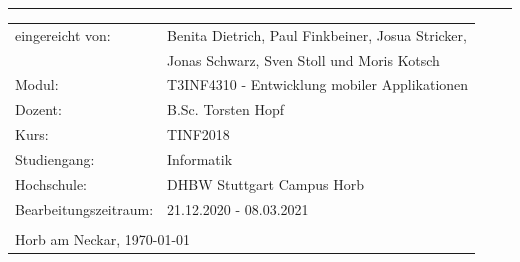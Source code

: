 \begin{flushleft}
    {\Large{}\rule[0.5ex]{1\columnwidth}{1pt}}{\Large\par}
    \par
\end{flushleft}

\begin{tabular}{ll}
    eingereicht von:\hspace{1cm} & Benita Dietrich, Paul Finkbeiner, Josua Stricker,
    \tabularnewline
    & Jonas Schwarz, Sven Stoll und Moris Kotsch
    \tabularnewline
    Modul: & T3INF4310 - Entwicklung mobiler Applikationen
    \tabularnewline
    Dozent: & B.Sc. Torsten Hopf
    \tabularnewline
    Kurs: & TINF2018
    \tabularnewline
    Studiengang: & Informatik
    \tabularnewline
    Hochschule: & DHBW Stuttgart Campus Horb
    \tabularnewline
    Bearbeitungszeitraum: & 21.12.2020 - 08.03.2021
    \tabularnewline
    \tabularnewline
    \multicolumn{2}{l}{Horb am Neckar, \today}
    \tabularnewline
\end{tabular}

\begin{flushleft}
    \newpage{}
    \par
\end{flushleft}